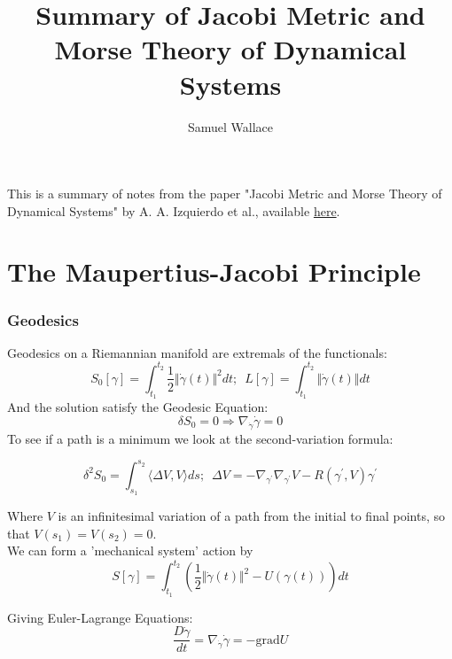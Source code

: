 \documentclass[notitlepage]{article}
\title{Summary of Jacobi Metric and Morse Theory of Dynamical Systems}
\author{Samuel Wallace}
\begin{document}
\maketitle

This is a summary of notes from the paper "Jacobi Metric and Morse Theory of Dynamical Systems" by A. A. Izquierdo et al., available \href{https://arxiv.org/pdf/math-ph/0212017.pdf}{here}.

\section{The Maupertius-Jacobi Principle}
\subsubsection{Geodesics}
\indent Geodesics on a Riemannian manifold are extremals of the functionals:
\begin{equation}\label{eq:1}
S_0[\gamma]=\int_{t_1}^{t_2} \frac{1}{2}\Vert \dot{\gamma}(t) \Vert^2 dt; \hspace{6pt} L[\gamma]=\int_{t_1}^{t_2}\Vert \dot{\gamma}(t)\Vert dt
\end{equation}
And the solution satisfy the Geodesic Equation:
\begin{equation}\label{eq:2}
\delta S_0 = 0 \Rightarrow \nabla_{\dot{\gamma}}\dot{\gamma}=0
\end{equation}
To see if a path is a minimum we look at the second-variation formula:

\begin{equation} \label{eq:3}
\delta^2S_0=\int_{s_1}^{s_2}\langle \Delta V, V \rangle ds; \hspace{6pt} \Delta V = - \nabla_{\gamma^{\prime}} \nabla_{\gamma^{\prime}} V - R(\gamma^{\prime}, V) \gamma^{\prime}
\end{equation}

\indent Where $V$ is an infinitesimal variation of a path from the initial to final points, so that $V(s_1) = V(s_2)=0$.\\
\indent We can form a 'mechanical system' action by 
\begin{equation}\label{eq:4}
    S[\gamma]=\int_{t_1}^{t_2}\left( \frac{1}{2}\Vert \dot{\gamma}(t) \Vert^2 - U(\gamma(t)) \right) dt
\end{equation}

Giving Euler-Lagrange Equations:
\begin{equation}\label{eq:5}
    \frac{D\dot{\gamma}}{dt}=\nabla_{\dot{\gamma}}\dot{\gamma} = - \mathrm{grad}U
\end{equation}
\end{document}
